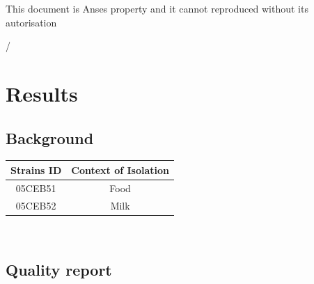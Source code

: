 \documentclass[a4paper]{article}
\begin{document}
\begin{titlepage}


This document is Anses property and it cannot reproduced without its autorisation
\begin{flushright}
\thepage/\pageref{LastPage}
\end{flushright}

\vfill %




\end{titlepage}

\setcounter{page}{2}


\section{Results} 
\subsection{Background \\}

{\renewcommand{\arraystretch}{1.5} %
{\setlength{\tabcolsep}{1cm} %
\centering
\begin{tabular}{|c|c|}
  \hline
  \textbf{Strains ID} & \textbf{Context of Isolation}\\
  \hline
  05CEB51 & Food \\%
  05CEB52 & Milk \\%
  \hline 
\end{tabular}\\[1cm]
}}




\subsection{Quality report \\}
\end{document}
